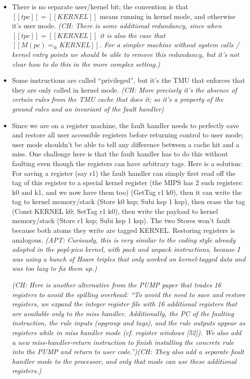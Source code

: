 \documentclass{article}
\newcommand{\ch}[1]{{\color{dkblue}\em (CH: #1)}}
\newcommand{\apt}[1]{{\color{red}\em (APT: #1)}}
\begin{document}
\begin{itemize}
\ch{Looking at interrupts on MIPS, one annoying thing is that our fault
  handler can't just ``turn off interrupts'' like the MIPS interrupt
  handlers do, since with tags the semantics of most machine
  instructions is not really defined in the absence of the TMU, and we
  need something very specific and much more sophisticated than the
  ``use a default tag'' strategy in the POPL paper.}
\item There is no separate user/kernel bit; the convention is that
  $[[tpc]]=[[KERNEL]]$ means running in kernel mode, and otherwise
  it's user mode. \ch{There is some additional redundancy, since when
    $[[tpc]]=[[KERNEL]]$ it is also the case that $[[M(pc) =
    _@KERNEL]]$. For a simpler machine without system calls / kernel
    entry points we should be able to remove this redundancy, but
    it's not clear how to do this in the more complex setting.}
\item Some instructions are called ``privileged'', but it's the TMU
  that enforces that they are only called in kernel mode.  \ch{More
    precisely it's the absence of certain rules from the TMU cache
    that does it; so it's a property of the ground rules and an
    invariant of the fault handler}
\item Since we are on a register machine, the fault handler needs to
  perfectly save and restore all user accessible registers before
  returning control to user mode; user mode shouldn't be able to tell
  any difference between a cache hit and a miss.
%
  One challenge here is that the fault handler has to do this without
  faulting even though the registers can have arbitrary tags. Here is
  a solution:
%
  For saving a register (say r1) the fault handler can simply
  first read off the tag of this register to a special kernel register
  (the MIPS has 2 such registers: k0 and k1, and we now have them too)
  (GetTag r1 k0), then it
  can write the tag to kernel memory/stack (Store k0 ksp; Subi ksp 1
  ksp), then erase the tag (Const KERNEL k0; SetTag r1 k0), then write
  the payload to kernel memory/stack (Store r1 ksp; Subi ksp 1
  ksp). The two Stores won't fault because both atoms they write are
  tagged KERNEL. Restoring registers is analogous.
  \apt{Curiously, this is very similar
    to the coding style already adopted in the popl-pico kernel, with
    pack and unpack instructions, because I was using a bunch of Hoare 
    triples that only worked on kernel-tagged data and was too lazy to
    fix them up.}

  \ch{Here is another alternative from the PUMP paper that trades 16
    registers to avoid the spilling overhead: ``To avoid the need to save
    and restore registers, we expand the integer register file with 16
    additional registers that are available only to the miss
    handler. Additionally, the PC of the faulting instruction, the
    rule inputs (opgroup and tags), and the rule outputs appear as
    registers while in miss handler mode (cf. register windows
    [52]). We also add a new miss-handler-return instruction to finish
    installing the concrete rule into the PUMP and return to user
    code.''}\ch{They also add a separate fault handler mode to the
    processor, and only that mode can use these additional registers.}


\end{itemize}
\end{document}
